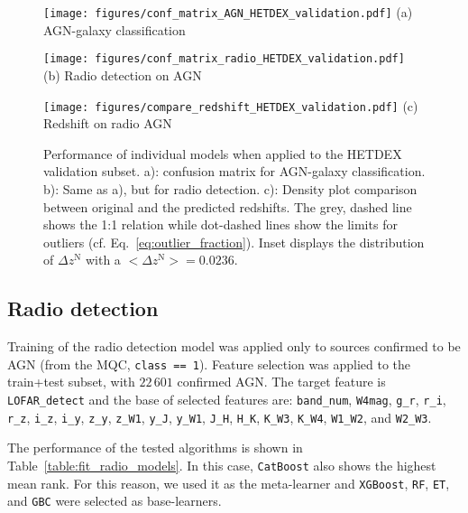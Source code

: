\documentclass{aa}
\begin{document}
\begin{figure}
  \centering
  \begin{minipage}{0.49\columnwidth}
    \centering
    \texttt{[image: figures/conf\_matrix\_AGN\_HETDEX\_validation.pdf]}\hfill\break
    {(a) AGN-galaxy classification}
  \end{minipage}%
  \begin{minipage}{0.49\columnwidth}
    \centering
    \texttt{[image: figures/conf\_matrix\_radio\_HETDEX\_validation.pdf]}\hfill\break
    {(b) Radio detection on AGN}
  \end{minipage}\hfill\break%
  \begin{minipage}{0.65\columnwidth}
    \centering
    \texttt{[image: figures/compare\_redshift\_HETDEX\_validation.pdf]}\hfill\break
    {(c) Redshift on radio AGN}
  \end{minipage}%
  \caption{Performance of individual models when applied to the HETDEX validation subset. a): confusion matrix for AGN-galaxy classification. 
  b): Same as a), but for radio detection. c): Density plot comparison between original and the predicted redshifts. 
  The grey, dashed line shows the 1:1 relation while dot-dashed lines show the limits for outliers (cf. Eq.~\ref{eq:outlier_fraction}). Inset displays the distribution of $\Delta z^{\mathrm{N}}$ with a ${{<}\Delta z^{\mathrm{N}}{>} = 0.0236}$.}
  \label{fig:results_models_validation}
\end{figure}

\subsection{Radio detection}\label{sec:results_radio}

Training of the radio detection model was applied only to sources confirmed to be AGN (from the MQC, \texttt{class == 1}).
Feature selection was applied to the train+test subset, with $22\,601$ confirmed AGN. 
The target feature is \verb|LOFAR_detect| and the base of selected features are:  \verb|band_num|, \verb|W4mag|, \verb|g_r|, \verb|r_i|, \verb|r_z|, \verb|i_z|, \verb|i_y|, \verb|z_y|, \verb|z_W1|, \verb|y_J|, \verb|y_W1|, \verb|J_H|, \verb|H_K|, \verb|K_W3|, \verb|K_W4|, \verb|W1_W2|, and \verb|W2_W3|.

The performance of the tested algorithms is shown in Table~\ref{table:fit_radio_models}. 
In this case, \verb|CatBoost| also shows the highest mean rank. For this reason, we used it as the meta-learner and \verb|XGBoost|, \verb|RF|, \verb|ET|, and \verb|GBC| were selected as base-learners.
\end{document}
